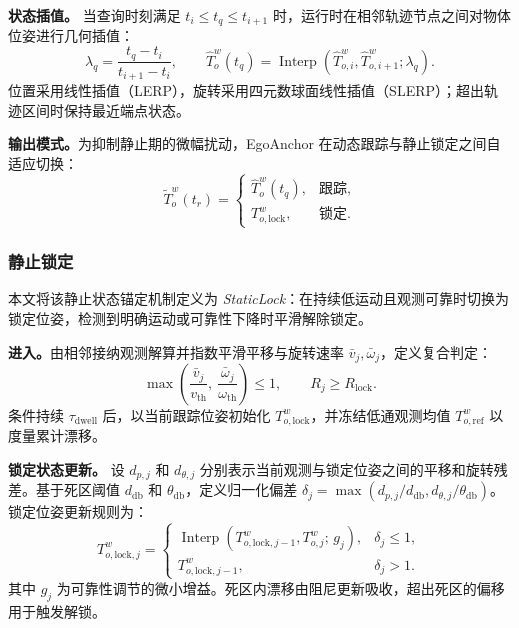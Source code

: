 \documentclass[review]{vgtc}
\begin{document}
\textbf{状态插值。}
当查询时刻满足 $t_i\leq t_q\leq t_{i+1}$ 时，运行时在相邻轨迹节点之间对物体位姿进行几何插值：
\begin{equation}
\lambda_q = \frac{t_q - t_i}{t_{i+1} - t_i}, \qquad
\widehat{T}_o^w(t_q) = \operatorname{Interp}(\widehat{T}_{o,i}^{w}, \widehat{T}_{o,i+1}^{w}; \lambda_q).
\label{eq:history-interp}
\end{equation}
位置采用线性插值（LERP），旋转采用四元数球面线性插值（SLERP）；超出轨迹区间时保持最近端点状态。

\textbf{输出模式。}为抑制静止期的微幅扰动，EgoAnchor 在动态跟踪与静止锁定之间自适应切换：
\begin{equation}
\widetilde{T}_o^w(t_r) = \begin{cases}
\widehat{T}_o^w(t_q), & \text{跟踪}, \\
T_{o,\mathrm{lock}}^w, & \text{锁定}.
\end{cases}
\label{eq:staticlock}
\end{equation}

\subsubsection{静止锁定}\label{sec:staticlock}

本文将该静止状态锚定机制定义为 \emph{StaticLock}：在持续低运动且观测可靠时切换为锁定位姿，检测到明确运动或可靠性下降时平滑解除锁定。

\textbf{进入。}由相邻接纳观测解算并指数平滑平移与旋转速率 $\bar v_j,\bar\omega_j$，定义复合判定：
\begin{equation}
\max\left(\frac{\bar{v}_j}{v_{\mathrm{th}}},\ \frac{\bar{\omega}_j}{\omega_{\mathrm{th}}}\right) \leq 1, \qquad R_j \geq R_{\mathrm{lock}}.
\label{eq:lock-entry}
\end{equation}
条件持续 $\tau_{\mathrm{dwell}}$ 后，以当前跟踪位姿初始化 $T_{o,\mathrm{lock}}^w$，并冻结低通观测均值 $T_{o,\mathrm{ref}}^w$ 以度量累计漂移。

\textbf{锁定状态更新。}
设 $d_{p,j}$ 和 $d_{\theta,j}$ 分别表示当前观测与锁定位姿之间的平移和旋转残差。基于死区阈值 $d_{\mathrm{db}}$ 和 $\theta_{\mathrm{db}}$，定义归一化偏差 $\delta_j=\max(d_{p,j}/d_{\mathrm{db}},d_{\theta,j}/\theta_{\mathrm{db}})$。锁定位姿更新规则为：
\begin{equation}
T_{o,\mathrm{lock},j}^w =
\begin{cases}
\operatorname{Interp}\left(T_{o,\mathrm{lock},j-1}^w, T_{o,j}^{w};\, g_j\right), & \delta_j \leq 1, \\
T_{o,\mathrm{lock},j-1}^w, & \delta_j > 1.
\end{cases}
\label{eq:lock-update}
\end{equation}
其中 $g_j$ 为可靠性调节的微小增益。死区内漂移由阻尼更新吸收，超出死区的偏移用于触发解锁。
\end{document}
